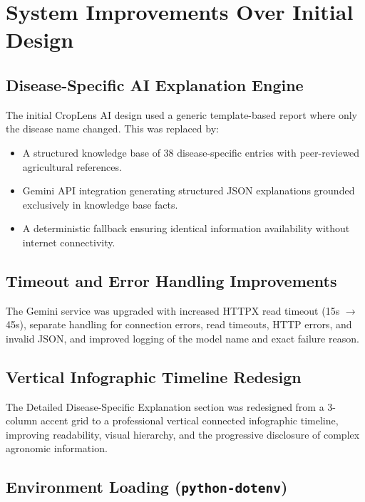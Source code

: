 \section{System Improvements Over Initial Design}

\subsection{Disease-Specific AI Explanation Engine}

The initial CropLens AI design used a generic template-based report where only the disease name changed. This was replaced by:
\begin{itemize}
    \item A structured knowledge base of 38 disease-specific entries with peer-reviewed agricultural references.
    \item Gemini API integration generating structured JSON explanations grounded exclusively in knowledge base facts.
    \item A deterministic fallback ensuring identical information availability without internet connectivity.
\end{itemize}

\subsection{Timeout and Error Handling Improvements}

The Gemini service was upgraded with increased HTTPX read timeout (15s $\rightarrow$ 45s), separate handling for connection errors, read timeouts, HTTP errors, and invalid JSON, and improved logging of the model name and exact failure reason.

\subsection{Vertical Infographic Timeline Redesign}

The Detailed Disease-Specific Explanation section was redesigned from a 3-column accent grid to a professional vertical connected infographic timeline, improving readability, visual hierarchy, and the progressive disclosure of complex agronomic information.

\subsection{Environment Loading (\texttt{python-}\allowbreak\texttt{dotenv})}

